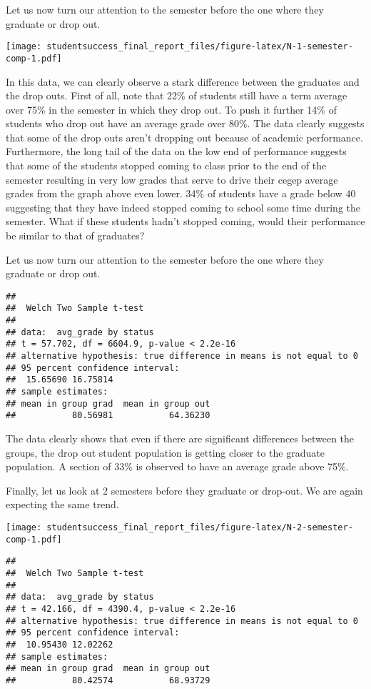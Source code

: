 \documentclass[]{book}
\theoremstyle{definition}
\theoremstyle{definition}
\theoremstyle{remark}
\begin{document}
Let us now turn our attention to the semester before the one where they
graduate or drop out.

\texttt{[image: studentsuccess\_final\_report\_files/figure-latex/N-1-semester-comp-1.pdf]}

In this data, we can clearly observe a stark difference between the
graduates and the drop outs. First of all, note that 22\% of students
still have a term average over 75\% in the semester in which they drop
out. To push it further 14\% of students who drop out have an average
grade over 80\%. The data clearly suggests that some of the drop outs
aren't dropping out because of academic performance. Furthermore, the
long tail of the data on the low end of performance suggests that some
of the students stopped coming to class prior to the end of the semester
resulting in very low grades that serve to drive their cegep average
grades from the graph above even lower. 34\% of students have a grade
below 40 suggesting that they have indeed stopped coming to school some
time during the semester. What if these students hadn't stopped coming,
would their performance be similar to that of graduates?

Let us now turn our attention to the semester before the one where they
graduate or drop out.

\begin{verbatim}
## 
##  Welch Two Sample t-test
## 
## data:  avg_grade by status
## t = 57.702, df = 6604.9, p-value < 2.2e-16
## alternative hypothesis: true difference in means is not equal to 0
## 95 percent confidence interval:
##  15.65690 16.75814
## sample estimates:
## mean in group grad  mean in group out 
##           80.56981           64.36230
\end{verbatim}

The data clearly shows that even if there are significant differences
between the groups, the drop out student population is getting closer to
the graduate population. A section of 33\% is observed to have an
average grade above 75\%.

Finally, let us look at 2 semesters before they graduate or drop-out. We
are again expecting the same trend.

\texttt{[image: studentsuccess\_final\_report\_files/figure-latex/N-2-semester-comp-1.pdf]}

\begin{verbatim}
## 
##  Welch Two Sample t-test
## 
## data:  avg_grade by status
## t = 42.166, df = 4390.4, p-value < 2.2e-16
## alternative hypothesis: true difference in means is not equal to 0
## 95 percent confidence interval:
##  10.95430 12.02262
## sample estimates:
## mean in group grad  mean in group out 
##           80.42574           68.93729
\end{verbatim}
\end{document}
